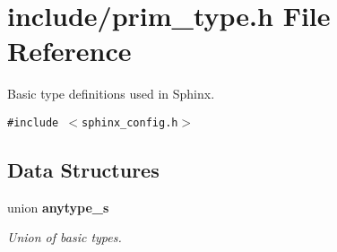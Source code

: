 \section{include/prim\_\-type.h File Reference}
\label{prim__type_8h}
Basic type definitions used in Sphinx.  


{\tt \#include $<$sphinx\_\-config.h$>$}\par
\subsection*{Data Structures}
\begin{CompactItemize}
\item 
union {\bf anytype\_\-s}
\begin{CompactList}\small\item\em Union of basic types. \item\end{CompactList}\end{CompactItemize}
